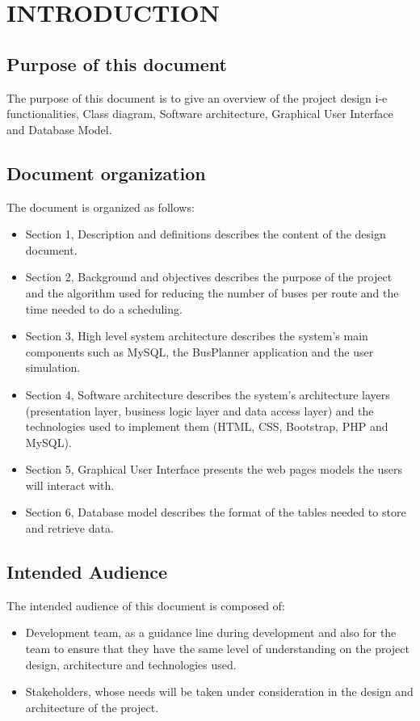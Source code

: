\section{INTRODUCTION}
\subsection{Purpose of this document}
The purpose of this document is to give an overview of the project design i-e functionalities, Class diagram, Software architecture, Graphical User Interface and Database Model.
\subsection{Document organization} 
The document is organized as follows:
\begin{itemize}
	\item Section 1, Description and definitions describes the content of the design document.
	\item Section 2, Background and objectives describes the purpose of the project and the algorithm used for reducing the number of buses per route and the time needed to do a scheduling.
	\item Section 3, High level system architecture describes the system's main components such as MySQL, the BusPlanner application and the user simulation.
	\item Section 4, Software architecture describes the system's architecture layers (presentation layer, business logic layer and data access layer) and the technologies used to implement them (HTML, CSS, Bootstrap, PHP and MySQL). 
	\item Section 5, Graphical User Interface presents the web pages models the users will interact with.
	\item Section 6, Database model describes the format of the tables needed to store and retrieve data.
\end{itemize}
\subsection{Intended Audience} 
The intended audience of this document is composed of:
\begin{itemize}
\item Development team, as a guidance line during development and also for the team to ensure that they have the same level of understanding on the project design, architecture and technologies used.
\item Stakeholders, whose needs will be taken under consideration in the design and architecture of the project.
\end{itemize}
